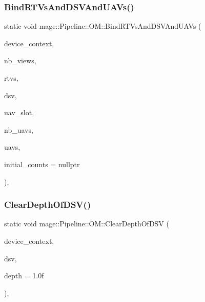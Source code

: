 \subsubsection{\texorpdfstring{Bind\+R\+T\+Vs\+And\+D\+S\+V\+And\+U\+A\+Vs()}{BindRTVsAndDSVAndUAVs()}}
{\footnotesize\ttfamily static void mage\+::\+Pipeline\+::\+O\+M\+::\+Bind\+R\+T\+Vs\+And\+D\+S\+V\+And\+U\+A\+Vs (\begin{DoxyParamCaption}\item[{I\+D3\+D11\+Device\+Context2 $\ast$}]{device\+\_\+context,  }\item[{\hyperlink{namespacemage_a41c104c036fba3756a74e19f793eeaa1}{U32}}]{nb\+\_\+views,  }\item[{I\+D3\+D11\+Render\+Target\+View $\ast$const $\ast$}]{rtvs,  }\item[{I\+D3\+D11\+Depth\+Stencil\+View $\ast$}]{dsv,  }\item[{\hyperlink{namespacemage_a41c104c036fba3756a74e19f793eeaa1}{U32}}]{uav\+\_\+slot,  }\item[{\hyperlink{namespacemage_a41c104c036fba3756a74e19f793eeaa1}{U32}}]{nb\+\_\+uavs,  }\item[{I\+D3\+D11\+Unordered\+Access\+View $\ast$const $\ast$}]{uavs,  }\item[{const \hyperlink{namespacemage_a41c104c036fba3756a74e19f793eeaa1}{U32} $\ast$}]{initial\+\_\+counts = {\ttfamily nullptr} }\end{DoxyParamCaption})\hspace{0.3cm}{\ttfamily [static]}, {\ttfamily [noexcept]}}

\hypertarget{structmage_1_1_pipeline_1_1_o_m_a531fd167683b24c3c66ecc99b5b10c7f}{}\label{structmage_1_1_pipeline_1_1_o_m_a531fd167683b24c3c66ecc99b5b10c7f} 
\subsubsection{\texorpdfstring{Clear\+Depth\+Of\+D\+S\+V()}{ClearDepthOfDSV()}}
{\footnotesize\ttfamily static void mage\+::\+Pipeline\+::\+O\+M\+::\+Clear\+Depth\+Of\+D\+SV (\begin{DoxyParamCaption}\item[{I\+D3\+D11\+Device\+Context2 $\ast$}]{device\+\_\+context,  }\item[{I\+D3\+D11\+Depth\+Stencil\+View $\ast$}]{dsv,  }\item[{\hyperlink{namespacemage_aa97e833b45f06d60a0a9c4fc22ae02c0}{F32}}]{depth = {\ttfamily 1.0f} }\end{DoxyParamCaption})\hspace{0.3cm}{\ttfamily [static]}, {\ttfamily [noexcept]}}

